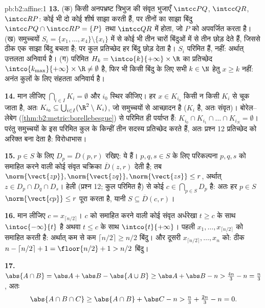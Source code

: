 \begin{solution}{pb:b2:affine:1}
\textbf{13.} (क) किसी अनपभ्रष्ट त्रिभुज की संवृत भुजाएँ $\intcc PQ$, $\intcc QR$, $\intcc RP$:
कोई भी दो कोई शीर्ष साझा करती हैं, पर तीनों का साझा बिंदु $\intcc
PQ \cap \intcc RP = \{P\}$ तथा $\intcc QR$ में
होता, जो $P$ को अपवर्जित करता है। (ख) समुच्चयों $S_i = \{x_1, \dots, x_4\}
\setminus \{x_i\}$ में से कोई भी तीन
चारों बिंदुओं में से तीन छोड़ देते हैं, जिससे ठीक एक साझा बिंदु बचता है;
पर कुल प्रतिच्छेद हर बिंदु छोड़ देता है। $S_i$ परिमित हैं,  नहीं:
अर्थात् उत्तलता अनिवार्य है। (ग) परिमित $H_k = \intco{k}{+\infty} \times
\R$ का प्रतिच्छेद $\intco{k_{\max}}{+\infty} \times \R \neq
\emptyset$ है, फिर भी
किसी बिंदु के लिए सभी $k \in \N$ हेतु $x \geq k$ नहीं: अनंत कुलों के लिए संहतता
अनिवार्य है।

\textbf{14.} मान लीजिए $\bigcap_{i \in I}K_i = \emptyset$ और $i_0$ स्थिर कीजिए। हर $x \in K_{i_0}$ किसी न किसी $K_i$ से
चूक जाता है, अतः $K_{i_0} \subseteq \bigcup_{i \in I}(\R^2 \setminus K_i)$, जो  समुच्चयों से आच्छादन है ($K_i$  है, अतः
संवृत)। बोरेल--लेबेग (\cref{thm:b2:metric:borellebesgue}) से परिमित ही पर्याप्त हैं: $K_{i_0} \cap K_{i_1} \cap \dots \cap K_{i_N} =
\emptyset$। परंतु 
समुच्चयों के इस परिमित कुल के किन्हीं तीन सदस्य प्रतिच्छेद करते हैं, अतः
प्रश्न 12 प्रतिच्छेद को अरिक्त बना देता है: विरोधाभास।

\textbf{15.} $p \in S$ के लिए $D_p = \overline D(p, r)$ रखिए: ये   हैं। $p, q, s \in S$ के लिए
परिकल्पना $p, q, s$ को समाहित करने वाली कोई संवृत चक्रिका $\overline D(z, r)$ देती है; तब $\norm{\vect{zp}}, \norm{\vect{zq}}, \norm{\vect{zs}}
\leq r$,
अर्थात् $z \in D_p \cap D_q \cap D_s$। हेली (प्रश्न 12; कुल परिमित है) से कोई $c \in
\bigcap_{p \in S}D_p$ है: अतः हर $p \in S$
$\norm{\vect{cp}} \leq r$ पूरा करता है, यानी $S \subseteq \overline D(c,
r)$।

\textbf{16.} मान लीजिए $c = x_{\lceil n/2\rceil}$। $c$ को समाहित करने वाली कोई संवृत अर्धरेखा
$t \geq
c$ के साथ $\intoc{-\infty}{t}$ है अथवा $t \leq c$ के साथ $\intco{t}{+\infty}$। पहली $x_1, \dots, x_{\lceil n/2\rceil}$ को समाहित करती है: अर्थात्
कम से कम $\lceil n/2\rceil \geq n/2$ बिंदु। और दूसरी $x_{\lceil n/2\rceil}, \dots, x_n$ को: ठीक $n - \lceil
n/2\rceil + 1 = \floor{n/2} + 1 > n/2$ बिंदु।

\textbf{17.} $\abs{A \cap B} = \abs A + \abs B - \abs{A \cup
B} \geq \abs A + \abs B - n > \tfrac{4n}3 - n = \tfrac n3$, अतः
\[
\abs{A \cap B \cap C} \geq \abs{A \cap B} + \abs C - n >
\tfrac n3 + \tfrac{2n}3 - n = 0 .
\]


\end{solution}
